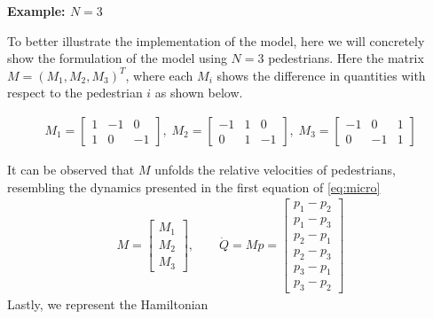\hrulefill

\textbf{Example: $N=3$}

To better illustrate the implementation of the model, here we will concretely show the formulation of the model using $N=3$ pedestrians. Here the matrix $M = (M_1, M_2, M_3)^T$, where each $M_i$ shows the difference in quantities with respect to the pedestrian $i$ as shown below.

\begin{gather*}
    M_1 = 
    \begin{bmatrix}
        1 & -1 & 0 \\
        1 & 0 & -1 
    \end{bmatrix},\;
    M_2 = 
    \begin{bmatrix}
        -1 & 1 & 0 \\
        0 & 1 & -1 
    \end{bmatrix},\;
    M_3 = 
    \begin{bmatrix}
        -1 & 0 & 1 \\
        0 & -1 & 1 
    \end{bmatrix}
\end{gather*}

It can be observed that $M$ unfolds the relative velocities of pedestrians, resembling the dynamics presented in the first equation of \autoref{eq:micro}
\begin{gather*}
    M = 
    \begin{bmatrix}
        M_1 \\ 
        M_2 \\
        M_3
    \end{bmatrix}, \qquad
    \dot Q = Mp = 
    \begin{bmatrix}
        p_1 - p_2 \\
        p_1 - p_3 \\
        p_2 - p_1 \\
        p_2 - p_3 \\
        p_3 - p_1 \\
        p_3 - p_2 
    \end{bmatrix}
\end{gather*}
Lastly, we represent the Hamiltonian

